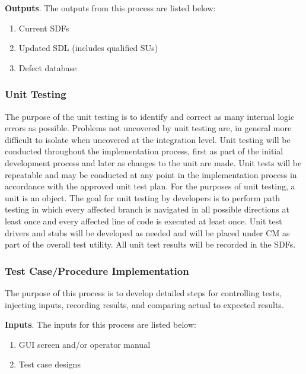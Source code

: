 \documentclass[a4paper, 11pt]{article}
\begin{document}
\textbf{Outputs}. The outputs from this process are listed below:
\begin{enumerate}
	\item Current SDFs
	\item Updated SDL (includes qualified SUs)
	\item Defect database
\end{enumerate}

\subsubsection{Unit Testing}
The purpose of the unit testing is to identify and correct as many internal logic errors as possible. Problems not uncovered by unit testing are, in general more difficult to isolate when uncovered at the integration level. Unit testing will be conducted throughout the implementation process, first as part of the initial development process and later as changes to the unit are made. Unit tests will be repeatable and may be conducted at any point in the implementation process in accordance with the approved unit test plan. For the purposes of unit
testing, a unit is an object. The goal for unit testing by developers is to perform path testing in which every affected branch is navigated in all possible directions at least once and every affected line of code is executed at least once. Unit test drivers and stubs will be developed as
needed and will be placed under CM as part of the overall test utility. All unit test results will be recorded in the SDFs.

\subsubsection{Test Case/Procedure Implementation}
The purpose of this process is to develop detailed steps for controlling tests, injecting inputs, recording results, and comparing actual to expected results.

\textbf{Inputs}. The inputs for this process are listed below:
\begin{enumerate}
	\item GUI screen and/or operator manual
	\item Test case designs
\end{enumerate}
\end{document}
